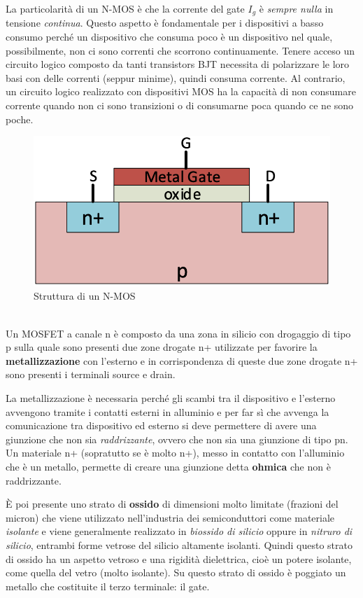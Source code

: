 \documentclass[12pt, a4paper]{report}
\begin{document}
La particolarità di un N-MOS è che la corrente del gate $I_{g}$ è \textit{sempre nulla} in tensione \textit{continua}. Questo aspetto è fondamentale per i dispositivi a basso consumo perché un dispositivo che consuma poco è un dispositivo nel quale, possibilmente, non ci sono correnti che scorrono continuamente. Tenere acceso un circuito logico composto da tanti transistors BJT necessita di polarizzare le loro basi con delle correnti (seppur minime), quindi consuma corrente. Al contrario, un circuito logico realizzato con dispositivi MOS ha la capacità di non consumare corrente quando non ci sono transizioni o di consumarne poca quando ce ne sono poche.
\begin{figure}[h]
    \centering
    \includegraphics[scale=0.4,angle=0]{n_mos_struttura.png}
    \caption{Struttura di un N-MOS}
    \label{struttura_nmos}
\end{figure}
\\Un MOSFET a canale n è composto da una zona in silicio con drogaggio di tipo p sulla quale sono presenti due zone drogate n+ utilizzate per favorire la \textbf{metallizzazione} con l'esterno e in corrispondenza di queste due zone drogate n+ sono presenti i terminali source e drain.

La metallizzazione è necessaria perché gli scambi tra il dispositivo e l'esterno avvengono tramite i contatti esterni in alluminio e per far sì che avvenga la comunicazione tra dispositivo ed esterno si deve permettere di avere una giunzione che non sia \textit{raddrizzante}, ovvero che non sia una giunzione di tipo pn. Un materiale n+ (sopratutto se è molto n+), messo in contatto con l'alluminio che è un metallo, permette di creare una giunzione detta \textbf{ohmica} che non è raddrizzante.

È poi presente uno strato di \textbf{ossido} di dimensioni molto limitate (frazioni del micron) che viene utilizzato nell'industria dei semiconduttori come materiale \textit{isolante} e viene generalmente realizzato in \textit{biossido di silicio} oppure in \textit{nitruro di silicio}, entrambi forme vetrose del silicio altamente isolanti. Quindi questo strato di ossido ha un aspetto vetroso e una rigidità dielettrica, cioè un potere isolante, come quella del vetro (molto isolante). Su questo strato di ossido è poggiato un metallo che costituite il terzo terminale: il gate.
\end{document}
